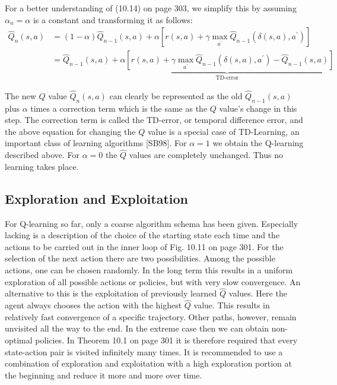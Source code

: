 \documentclass[10pt]{book}
\begin{document}
For a better understanding of (10.14) on page 303, we simplify this by assuming $\alpha_{n}=\alpha$ is a constant and transforming it as follows:
$$
\begin{aligned}
\hat{Q}_{n}(s, a) &=(1-\alpha) \hat{Q}_{n-1}(s, a)+\alpha\left[r(s, a)+\gamma \max_{a^{\prime}} \hat{Q}_{n-1}\left(\delta(s, a), a^{\prime}\right)\right] \\
&=\hat{Q}_{n-1}(s, a)+\underbrace{\alpha\left[r(s, a)+\gamma \max_{a^{\prime}} \hat{Q}_{n-1}\left(\delta(s, a), a^{\prime}\right)-\hat{Q}_{n-1}(s, a)\right]}_{\text{TD-error}}
\end{aligned}
$$

The new $Q$ value $\hat{Q}_{n}(s, a)$ can clearly be represented as the old $\hat{Q}_{n-1}(s, a)$ plus $\alpha$ times a correction term which is the same as the $Q$ value's change in this step. The correction term is called the TD-error, or temporal difference error, and the above equation for changing the $Q$ value is a special case of TD-Learning, an important class of learning algorithms [SB98]. For $\alpha=1$ we obtain the Q-learning described above. For $\alpha=0$ the $\hat{Q}$ values are completely unchanged. Thus no learning takes place.

\subsection{Exploration and Exploitation}
For Q-learning so far, only a coarse algorithm schema has been given. Especially lacking is a description of the choice of the starting state each time and the actions to be carried out in the inner loop of Fig. 10.11 on page 301. For the selection of the next action there are two possibilities. Among the possible actions, one can be chosen randomly. In the long term this results in a uniform exploration of all possible actions or policies, but with very slow convergence. An alternative to this is the exploitation of previously learned $\hat{Q}$ values. Here the agent always chooses the action with the highest $\hat{Q}$ value. This results in relatively fast convergence of a specific trajectory. Other paths, however, remain unvisited all the way to the end. In the extreme case then we can obtain non-optimal policies. In Theorem 10.1 on page 301 it is therefore required that every state-action pair is visited infinitely many times. It is recommended to use a combination of exploration and exploitation with a high exploration portion at the beginning and reduce it more and more over time.
\end{document}

